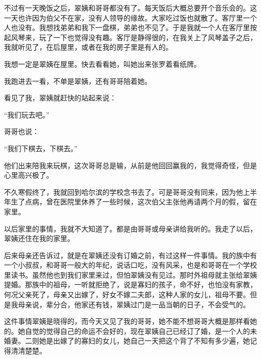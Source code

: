 \par 不过有一天晚饭之后，翠姨和哥哥都没有了。每天饭后大概总要开个音乐会的。这一天也许因为伯父不在家，没有人领导的缘故。大家吃过饭也就散了。客厅里一个人也没有。我想找弟弟和我下一盘棋，弟弟也不见了。于是我就一个人在客厅里按起风琴来，玩了一下也觉得没有趣。客厅是静得很的，在我关上了风琴盖子之后，我就听见了，在后屋里，或者在我的房子里是有人的。
\par 我想一定是翠姨在屋里。快去看看她，叫她出来张罗着看纸牌。
\par 我跑进去一看，不单是翠姨，还有哥哥陪着她。
\par 看见了我，翠姨就赶快的站起来说：
\par “我们玩去吧。”
\par 哥哥也说：
\par “我们下棋去，下棋去。”
\par 他们出来陪我来玩棋，这次哥哥总是输，从前是他回回赢我的，我觉得奇怪，但是心里高兴极了。
\par 不久寒假终了，我就回到哈尔滨的学校念书去了。可是哥哥没有同来，因为他上半年生了点病，曾在医院里休养了一些时候，这次伯父主张他再请两个月的假，留在家里。
\par 以后家里的事情，我就不大知道了。都是由哥哥或母亲讲给我听的。我走了以后，翠姨还住在我的家里。
\par 后来母亲还告诉过，就是在翠姨还没有订婚之前，有过这样一件事情。我的族中有一个小叔叔，和哥哥一般大的年纪，说话口吃，没有风采，也是和哥哥在一个学校里读书。虽然他也到我们家里来过，但怕翠姨没有见过。那时外祖母就主张给翠姨提婚。那族中的祖母，一听就拒绝了，说是寡妇的孩子，命不好，也怕没有家教，何况父亲死了，母亲又出嫁了，好女不嫁二夫郎，这种人家的女儿，祖母不要。但是我母亲说，辈分合，他家还有钱，翠姨过门是一品当朝的日子，不会受气的。
\par 这件事情翠姨是晓得的，而今天又见了我的哥哥，她不能不想哥哥大概是那样看她的。她自觉的觉得自己的命运不会好的，现在翠姨自己已经订了婚，是一个人的未婚妻。二则她是出嫁了的寡妇的女儿，她自己一天把这个背了不知有多少遍，她记得清清楚楚。
